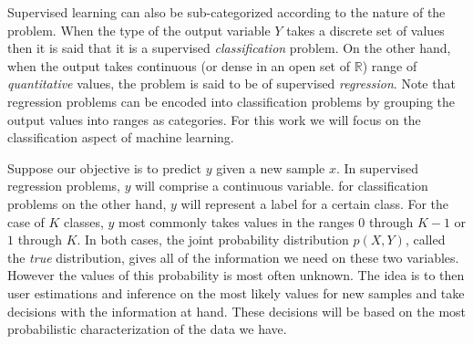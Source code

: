Supervised learning can also be sub-categorized according to the nature of the problem. When the type of the output variable $Y$ takes a discrete set of values then it is said that it is a supervised \textit{classification} problem. On the other hand, when the output takes continuous (or dense in an open set of $\mathbb{R}$) range of \textit{quantitative} values, the problem is said to be of supervised \textit{regression}. Note that regression problems can be encoded into classification problems by grouping the output values into ranges  as categories. For this work we will focus on the classification aspect of machine learning.

Suppose our objective is to predict $y$ given a new sample $x$. In supervised regression problems, $y$ will comprise a continuous variable. for classification problems on the other hand, $y$ will represent a label for a certain class. For the case of $K$ classes, $y$ most commonly takes values in the ranges $0$ through $K-1$  or $1$ through $K$. In both cases, the joint probability distribution $p(X, Y)$, called the \textit{true} distribution, gives all of the information we need on these two variables. However the values of this probability is most often unknown. The idea is to then user estimations and inference on the most likely values for new samples and take decisions with the information at hand. These decisions will be based on the most probabilistic characterization of the data we have. 

